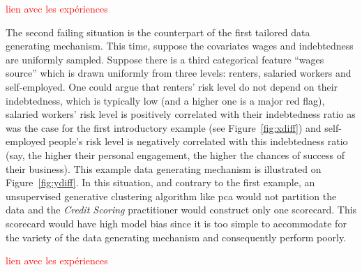 \textcolor{red}{lien avec les expériences}


The second failing situation is the counterpart of the first tailored data generating mechanism. This time, suppose the covariates wages and indebtedness are uniformly sampled. Suppose there is a third categorical feature ``wages source'' which is drawn uniformly from three levels: renters, salaried workers and self-employed. One could argue that renters' risk level do not depend on their indebtedness, which is typically low (and a higher one is a major red flag), salaried workers' risk level is positively correlated with their indebtedness ratio as was the case for the first introductory example (see Figure~\ref{fig:xdiff}) and self-employed people's risk level is negatively correlated with this indebtedness ratio (say, the higher their personal engagement, the higher the chances of success of their business). This example data generating mechanism is illustrated on Figure~\ref{fig:ydiff}. In this situation, and contrary to the first example, an unsupervised generative clustering algorithm like \gls{pca} would not partition the data and the \textit{Credit Scoring} practitioner would construct only one scorecard. This scorecard would have high model bias since it is too simple to accommodate for the variety of the data generating mechanism and consequently perform poorly.



\textcolor{red}{lien avec les expériences}



